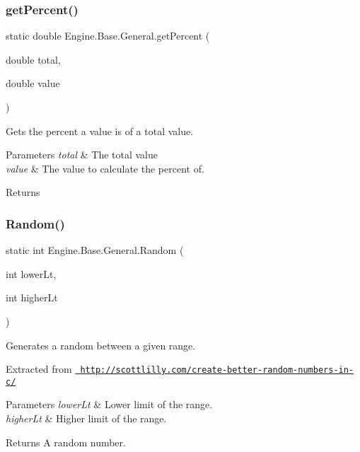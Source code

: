 \subsubsection{\texorpdfstring{getPercent()}{getPercent()}}
{\footnotesize\ttfamily static double Engine.\+Base.\+General.\+get\+Percent (\begin{DoxyParamCaption}\item[{double}]{total,  }\item[{double}]{value }\end{DoxyParamCaption})\hspace{0.3cm}{\ttfamily [static]}}



Gets the percent a value is of a total value. 


\begin{DoxyParams}{Parameters}
{\em total} & The total value\\
\hline
{\em value} & The value to calculate the percent of.\\
\hline
\end{DoxyParams}
\begin{DoxyReturn}{Returns}

\end{DoxyReturn}
\mbox{\label{class_engine_1_1_base_1_1_general_a85c9268f77d1ec0d86501fbb7ee2b39a}} 
\subsubsection{\texorpdfstring{Random()}{Random()}}
{\footnotesize\ttfamily static int Engine.\+Base.\+General.\+Random (\begin{DoxyParamCaption}\item[{int}]{lower\+Lt,  }\item[{int}]{higher\+Lt }\end{DoxyParamCaption})\hspace{0.3cm}{\ttfamily [static]}}



Generates a random between a given range. 

Extracted from \href{http://scottlilly.com/create-better-random-numbers-in-c/}{\texttt{ http\+://scottlilly.\+com/create-\/better-\/random-\/numbers-\/in-\/c/}} 


\begin{DoxyParams}{Parameters}
{\em lower\+Lt} & Lower limit of the range.\\
\hline
{\em higher\+Lt} & Higher limit of the range.\\
\hline
\end{DoxyParams}
\begin{DoxyReturn}{Returns}
A random number.
\end{DoxyReturn}


